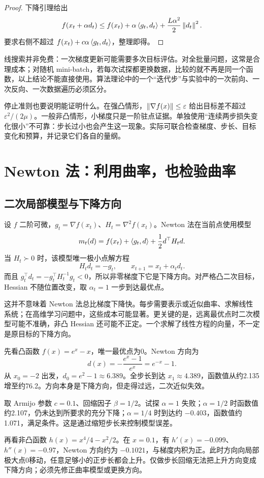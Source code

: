 \begin{proof}
下降引理给出
\[
 f(x_t+\alpha d_t)
 \leq f(x_t)+\alpha\left\langle g_t,d_t\right\rangle
       +\frac{L\alpha^2}{2}\left\lVert d_t\right\rVert^2.
\]
要求右侧不超过 $f(x_t)+c\alpha\left\langle g_t,d_t\right\rangle$，整理即得。
\end{proof}

线搜索并非免费：一次梯度更新可能需要多次目标评估。对全批量问题，这常是合理成本；对随机 mini-batch，若每次试探都更换数据，比较的就不再是同一个函数，以上结论不能直接使用。算法理论中的一个“迭代步”与实验中的一次前向、一次反向、一次数据遍历必须区分。

停止准则也要说明能证明什么。在强凸情形，$\left\lVert\nabla f(x)\right\rVert\leq\varepsilon$ 给出目标差不超过 $\varepsilon^2/(2\mu)$。一般非凸情形，小梯度只是一阶驻点证据。单独使用“连续两步损失变化很小”不可靠：步长过小也会产生这一现象。实际可联合检查梯度、步长、目标变化和预算，并记录它们各自的量纲。

\section{Newton 法：利用曲率，也检验曲率}
\label{l1:newton}

\subsection{二次局部模型与下降方向}

设 $f$ 二阶可微，$g_t=\nabla f(x_t)$、$H_t=\nabla^2f(x_t)$。Newton 法在当前点使用模型
\[
 m_t(d)=f(x_t)+\left\langle g_t,d\right\rangle+\frac12d^\top H_td.
\]
当 $H_t\succ0$ 时，该模型唯一极小点解方程
\begin{equation}
 H_td_t=-g_t,
 \qquad x_{t+1}=x_t+\alpha_td_t.
 \label{l1:newton-step}
\end{equation}
而且 $g_t^\top d_t=-g_t^\top H_t^{-1}g_t<0$，所以非零梯度下它是下降方向。对严格凸二次目标，Hessian 不随位置改变，取 $\alpha_t=1$ 一步到达最优点。

这并不意味着 Newton 法总比梯度下降快。每步需要表示或近似曲率、求解线性系统；在高维学习问题中，这些成本可能显著。更关键的是，远离最优点时二次模型可能不准确，非凸 Hessian 还可能不正定。一个求解了线性方程的向量，不一定是原目标的下降方向。

\begin{example}
\label{l1:ex-newton}
先看凸函数 $f(x)=e^x-x$，唯一最优点为0。Newton 方向为
\[
 d(x)=-\frac{e^x-1}{e^x}=e^{-x}-1.
\]
从 $x_0=-2$ 出发，$d_0=e^2-1\approx6.389$。全步长到达 $x_1\approx4.389$，函数值从约2.135增至约76.2。方向本身是下降方向，但走得过远，二次近似失效。

取 Armijo 参数 $c=0.1$、回缩因子 $\beta=1/2$。试探 $\alpha=1$ 失败；$\alpha=1/2$ 时函数值约2.107，仍未达到所要求的充分下降；$\alpha=1/4$ 时到达约 $-0.403$，函数值约1.071，满足条件。这是通过缩短步长来控制模型误差。

再看非凸函数 $h(x)=x^4/4-x^2/2$。在 $x=0.1$，有 $h'(x)=-0.099$、$h''(x)=-0.97$，Newton 方向约为 $-0.1021$，与梯度内积为正。此时方向向局部极大点0移动，任意足够小的正步长都会上升。仅做步长回缩无法把上升方向变成下降方向；必须先修正曲率模型或更换方向。
\end{example}

